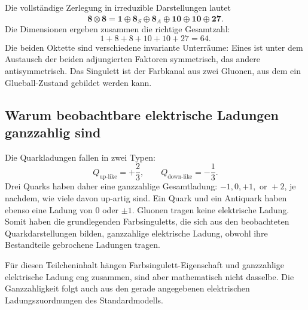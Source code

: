 Die vollständige Zerlegung in irreduzible Darstellungen lautet
\begin{equation}
\boldsymbol 8\otimes\boldsymbol 8
=\boldsymbol 1\oplus\boldsymbol 8_S\oplus\boldsymbol 8_A
\oplus\boldsymbol{10}\oplus\overline{\boldsymbol{10}}
\oplus\boldsymbol{27}.
\label{eq:l4-eight-times-eight}
\end{equation}
Die Dimensionen ergeben zusammen die richtige Gesamtzahl:
\begin{equation}
1+8+8+10+10+27=64.
\end{equation}
Die beiden Oktette sind verschiedene invariante Unterräume: Eines ist unter dem Austausch der beiden adjungierten Faktoren symmetrisch, das andere antisymmetrisch. Das Singulett ist der Farbkanal aus zwei Gluonen, aus dem ein Glueball-Zustand gebildet werden kann.

\subsection{Warum beobachtbare elektrische Ladungen ganzzahlig sind}

Die Quarkladungen fallen in zwei Typen:
\begin{equation}
Q_{\mathrm{up\text{-}like}}=+\frac23,
\qquad
Q_{\mathrm{down\text{-}like}}=-\frac13.
\end{equation}
Drei Quarks haben daher eine ganzzahlige Gesamtladung: \(-1,0,+1,\text{ or }+2\), je nachdem, wie viele davon up-artig sind. Ein Quark und ein Antiquark haben ebenso eine Ladung von \(0\) oder \(\pm1\). Gluonen tragen keine elektrische Ladung. Somit haben die grundlegenden Farbsinguletts, die sich aus den beobachteten Quarkdarstellungen bilden, ganzzahlige elektrische Ladung, obwohl ihre Bestandteile gebrochene Ladungen tragen.

\begin{classroomqa}
\end{classroomqa}

Für diesen Teilcheninhalt hängen Farbsingulett-Eigenschaft und ganzzahlige elektrische Ladung eng zusammen, sind aber mathematisch nicht dasselbe. Die Ganzzahligkeit folgt auch aus den gerade angegebenen elektrischen Ladungszuordnungen des Standardmodells.

